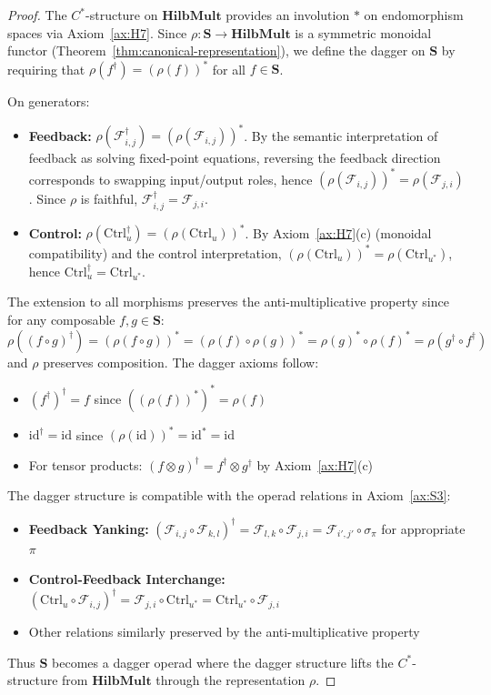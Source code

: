 \documentclass[11pt]{article}
\begin{document}
\begin{proof}
The $C^*$-structure on $\mathbf{HilbMult}$ provides an involution $*$ on endomorphism spaces via Axiom~\ref{ax:H7}. Since $\rho: \mathbf{S} \to \mathbf{HilbMult}$ is a symmetric monoidal functor (Theorem~\ref{thm:canonical-representation}), we define the dagger on $\mathbf{S}$ by requiring that $\rho(f^\dagger) = (\rho(f))^*$ for all $f \in \mathbf{S}$.

On generators:
\begin{itemize}
    \item \textbf{Feedback:} $\rho(\mathcal{F}_{i,j}^\dagger) = (\rho(\mathcal{F}_{i,j}))^*$. By the semantic interpretation of feedback as solving fixed-point equations, reversing the feedback direction corresponds to swapping input/output roles, hence $(\rho(\mathcal{F}_{i,j}))^* = \rho(\mathcal{F}_{j,i})$. Since $\rho$ is faithful, $\mathcal{F}_{i,j}^\dagger = \mathcal{F}_{j,i}$.

    \item \textbf{Control:} $\rho(\mathrm{Ctrl}_u^\dagger) = (\rho(\mathrm{Ctrl}_u))^*$. By Axiom~\ref{ax:H7}(c) (monoidal compatibility) and the control interpretation, $(\rho(\mathrm{Ctrl}_u))^* = \rho(\mathrm{Ctrl}_{u^*})$, hence $\mathrm{Ctrl}_u^\dagger = \mathrm{Ctrl}_{u^*}$.
\end{itemize}

The extension to all morphisms preserves the anti-multiplicative property since for any composable $f, g \in \mathbf{S}$:
\[
\rho((f \circ g)^\dagger) = (\rho(f \circ g))^* = (\rho(f) \circ \rho(g))^* = \rho(g)^* \circ \rho(f)^* = \rho(g^\dagger \circ f^\dagger)
\]
and $\rho$ preserves composition. The dagger axioms follow:
\begin{itemize}
    \item $(f^\dagger)^\dagger = f$ since $((\rho(f))^*)^* = \rho(f)$
    \item $\mathrm{id}^\dagger = \mathrm{id}$ since $(\rho(\mathrm{id}))^* = \mathrm{id}^* = \mathrm{id}$
    \item For tensor products: $(f \otimes g)^\dagger = f^\dagger \otimes g^\dagger$ by Axiom~\ref{ax:H7}(c)
\end{itemize}

The dagger structure is compatible with the operad relations in Axiom~\ref{ax:S3}:
\begin{itemize}
    \item \textbf{Feedback Yanking:} $(\mathcal{F}_{i,j} \circ \mathcal{F}_{k,l})^\dagger = \mathcal{F}_{l,k} \circ \mathcal{F}_{j,i} = \mathcal{F}_{i',j'} \circ \sigma_{\pi}$ for appropriate $\pi$
    \item \textbf{Control-Feedback Interchange:} $(\mathrm{Ctrl}_u \circ \mathcal{F}_{i,j})^\dagger = \mathcal{F}_{j,i} \circ \mathrm{Ctrl}_{u^*} = \mathrm{Ctrl}_{u^*} \circ \mathcal{F}_{j,i}$
    \item Other relations similarly preserved by the anti-multiplicative property
\end{itemize}

Thus $\mathbf{S}$ becomes a dagger operad where the dagger structure lifts the $C^*$-structure from $\mathbf{HilbMult}$ through the representation $\rho$.
\end{proof}
\end{document}
